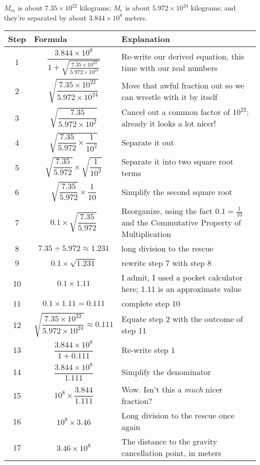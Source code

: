 \documentclass[10pt,letterpaper]{report}
\begin{document}
$M_m$ is about $7.35 \times 10^{22}$ kilograms;
$M_e$ is about $5.972 \times 10^{24}$ kilograms;
and they're separated by about $3.844 \times 10^8$ meters.

\begin{longtable}{| c | p{} | p{} |}
  \hline
  Step & Formula & Explanation \\
  \hline \endhead
  \rowcolor[gray]{0.95} 1 & \[ \frac{3.844 \times 10^8}{1 + \sqrt{\frac{7.35 \times
        10^{22}}{5.972 \times 10^{24}}}} \] & Re-write our derived
    equation, this time with our real numbers \\
    \hline
  2 & \[ \sqrt{\frac{7.35 \times 10^{22}}{5.972 \times 10^{24}}} \] & Move
  that awful fraction out so we can wrestle with it by itself \\
  \hline
  \rowcolor[gray]{0.95} 3 & \[ \sqrt{\frac{7.35}{5.972 \times 10^{2}}}\] & Cancel out a common factor
    of $10^{22}$: already it looks a lot nicer! \\
  \hline
  4 & \[ \sqrt{\frac{7.35}{5.972} \times \frac{1}{10^2}} \] & Separate it out
  \\
  \hline
  \rowcolor[gray]{0.95} 5 & \[ \sqrt{\frac{7.35}{5.972}} \times \sqrt{\frac{1}{10^2}} \] & 
  Separate it into two square root terms \\
  \hline
  6 & \[ \sqrt{\frac{7.35}{5.972}} \times \frac{1}{10} \] & Simplify the
  second square root \\
  \hline
  \rowcolor[gray]{0.95} 7 & \[ 0.1 \times \sqrt{\frac{7.35}{5.972}} \] & Reorganize, using
  the fact $0.1 = \frac{1}{10}$ and the Commutative Property of
  Multiplication \\
  \hline
  8 & \[ 7.35 \div 5.972 \approx 1.231 \] & long division to the
  rescue \\
  \hline
  \rowcolor[gray]{0.95} 9 & \[ 0.1 \times \sqrt{1.231} \] & rewrite step 7 with step 8 \\
  \hline
  10 & \[ 0.1 \times 1.11 \] & I admit, I used a pocket calculator
  here; 1.11 is an approximate value\\
  \hline
  \rowcolor[gray]{0.95} 11 & \[ 0.1 \times 1.11 = 0.111 \] & complete step 10 \\
  \hline
  12 & \[ \sqrt{\frac{7.35 \times 10^{22}}{5.972 \times 10^{24}}}
  \approx 0.111 \] & Equate step 2 with the outcome of step 11 \\
  \hline
  \rowcolor[gray]{0.95} 13 & \[ \frac{3.844 \times 10^8}{1 + 0.111} \] & Re-write step 1 \\
  \hline
  14 & \[ \frac{3.844 \times 10^8}{1.111} \] & Simplify the
  denominator \\
  \hline
  \rowcolor[gray]{0.95} 15 & \[ 10^8 \times \frac{3.844}{1.111} \] & Wow.  Isn't this a
  \textit{much} nicer fraction? \\
  \hline
  16 & \[ 10^8 \times 3.46 \] & Long division to the rescue once again
  \\
  \hline
  \rowcolor[gray]{0.95} 17 & \[ 3.46 \times 10^8 \] & The distance to the gravity cancellation
  point, in meters \\
  \hline
\end{longtable}
\end{document}
